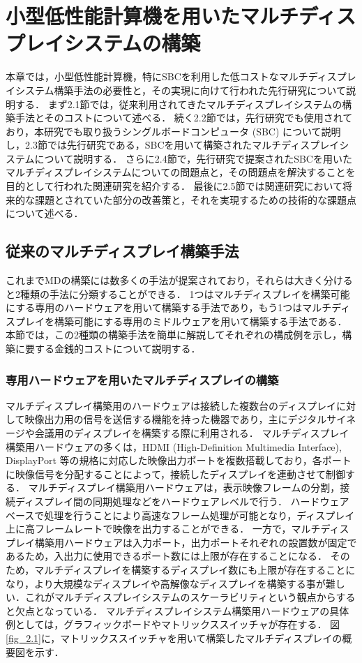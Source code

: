 \chapter{小型低性能計算機を用いたマルチディスプレイシステムの構築}

本章では，小型低性能計算機，特にSBCを利用した低コストなマルチディスプレイシステム構築手法の必要性と，その実現に向けて行われた先行研究について説明する．
まず2.1節では，従来利用されてきたマルチディスプレイシステムの構築手法とそのコストについて述べる．
続く2.2節では，先行研究でも使用されており，本研究でも取り扱うシングルボードコンピュータ (SBC) について説明し，2.3節では先行研究である，SBCを用いて構築されたマルチディスプレイシステムについて説明する．
さらに2.4節で，先行研究で提案されたSBCを用いたマルチディスプレイシステムについての問題点と，その問題点を解決することを目的として行われた関連研究を紹介する．
最後に2.5節では関連研究において将来的な課題とされていた部分の改善策と，それを実現するための技術的な課題点について述べる．

\section{従来のマルチディスプレイ構築手法}
これまでMDの構築には数多くの手法が提案されており，それらは大きく分けると2種類の手法に分類することができる\cite{pccluster,6693038}．
1つはマルチディスプレイを構築可能にする専用のハードウェアを用いて構築する手法であり，もう1つはマルチディスプレイを構築可能にする専用のミドルウェアを用いて構築する手法である．
本節では，この2種類の構築手法を簡単に解説してそれぞれの構成例を示し，構築に要する金銭的コストについて説明する．

\subsection*{専用ハードウェアを用いたマルチディスプレイの構築}

マルチディスプレイ構築用のハードウェアは接続した複数台のディスプレイに対して映像出力用の信号を送信する機能を持った機器であり，主にデジタルサイネージ\cite{signage}や会議用のディスプレイを構築する際に利用される．
マルチディスプレイ構築用ハードウェアの多くは，HDMI (High-Definition Multimedia Interface), DisplayPort \cite{displayport}等の規格に対応した映像出力ポートを複数搭載しており，各ポートに映像信号を分配することによって，接続したディスプレイを連動させて制御する．
マルチディスプレイ構築用ハードウェアは，表示映像フレームの分割，接続ディスプレイ間の同期処理などをハードウェアレベルで行う．
ハードウェアベースで処理を行うことにより高速なフレーム処理が可能となり，ディスプレイ上に高フレームレートで映像を出力することができる．
一方で，マルチディスプレイ構築用ハードウェアは入力ポート，出力ポートそれぞれの設置数が固定であるため，入出力に使用できるポート数には上限が存在することになる．
そのため，マルチディスプレイを構築するディスプレイ数にも上限が存在することになり，より大規模なディスプレイや高解像なディスプレイを構築する事が難しい．これがマルチディスプレイシステムのスケーラビリティという観点からすると欠点となっている．
マルチディスプレイシステム構築用ハードウェアの具体例としては，グラフィックボードやマトリックススイッチャが存在する．
図\ref{fig_2.1}に，マトリックススイッチャを用いて構築したマルチディスプレイの概要図を示す．

